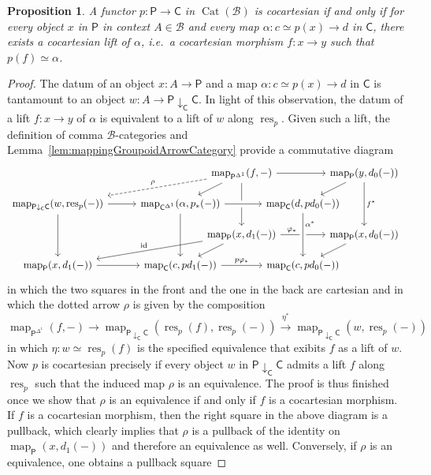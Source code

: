 \documentclass[reqno]{amsart}
\numberwithin{equation}{subsection}
\theoremstyle{plain}
\newtheorem{proposition}[equation]{Proposition}
\theoremstyle{definition}
\let\scr=\mathcal
\let\phi=\varphi
\def\BB{\scr B}
\DeclareMathOperator{\id}{id}
\DeclareMathOperator{\Cat}{Cat}
\DeclareMathOperator{\Map}{map}
\DeclareMathOperator{\res}{res}
\newcommand{\map}[1]{\Map_{#1}}
\newcommand{\I}[1]{\mathsf{#1}}
\newcommand{\Comma}[3]{{#1}\downarrow_{#2}{#3}}
\begin{document}
\begin{proposition}
	\label{prop:characterisationCocartesianFibrationCocartesianMaps}
	A functor $p\colon \I{P}\to\I{C}$ in $\Cat(\BB)$ is cocartesian if and only if for every object $x$ in $\I{P}$ in context $A\in\BB$ and every map $\alpha\colon c\simeq p(x)\to d$ in $\I{C}$, there exists a cocartesian lift of $\alpha$, i.e.\ a cocartesian morphism $f\colon x\to y$ such that $p(f)\simeq \alpha$.
\end{proposition}
\begin{proof}
	The datum of an object $x\colon A\to\I{P}$ and a map $\alpha\colon c\simeq p(x)\to d$ in $\I{C}$ is tantamount to an object $w\colon A\to \Comma{\I{P}}{\I{C}}{\I{C}}$. In light of this observation, the datum of a lift $f\colon x\to y$ of $\alpha$ is equivalent to a lift of $w$ along $\res_p$. Given such a lift, the definition of comma $\BB$-categories and Lemma~\ref{lem:mappingGroupoidArrowCategory} provide a commutative diagram
	\begin{equation*}
	\begin{tikzcd}[column sep={6em,between origins},row sep={3em,between origins}]
	& && \map{\I{P}^{\Delta^1}}(f, -)\arrow[rr]\arrow[dl]\arrow[dd]&& \map{\I{P}}(y, d_0(-))\arrow[dl]\arrow[dd, "f^\ast"] \\
	\map{\Comma{\I{P}}{\I{C}}{\I{C}}}(w,\res_p(-))\arrow[dd]\arrow[rr]\arrow[from=urrr, dashed, "\rho"'] && \map{\I{C}^{\Delta^1}}(\alpha, p_\ast(-))\arrow[dd, crossing over]\arrow[rr, crossing over] && \map{\I{C}}(d,pd_0(-)) &\\
	& && \map{\I{P}}(x,d_1(-))\arrow[rr, "\phi_\ast", near start]\arrow[dl]&& \map{\I{P}}(x,d_0(-))\arrow[dl]\\
	\map{\I{P}}(x,d_1(-))\arrow[rr]\arrow[from=urrr, "\id"'] && \map{\I{C}}(c, pd_1(-))\arrow[rr, "p\phi_\ast"] && \map{\I{C}}(c,pd_0(-))\arrow[from=uu, crossing over, "\alpha^\ast", near start] &
	\end{tikzcd}
	\end{equation*}
	in which the two squares in the front and the one in the back are cartesian and in which the dotted arrow $\rho$ is given by the composition
	\begin{equation*}
	\map{\I{P}^{\Delta^1}}(f,-)\to \map{\Comma{\I{P}}{\I{C}}{\I{C}}}(\res_p(f),\res_p(-))\xrightarrow{\eta^\ast} \map{\Comma{\I{P}}{\I{C}}{\I{C}}}(w,\res_p(-))
	\end{equation*}
	in which $\eta\colon w\simeq\res_p(f)$ is the specified equivalence that exibits $f$ as a lift of $w$. Now $p$ is cocartesian precisely if every object $w$ in $\Comma{\I{P}}{\I{C}}{\I{C}}$ admits a lift $f$ along $\res_p$ such that the induced map $\rho$ is an equivalence. The proof is thus finished once we show that $\rho$ is an equivalence if and only if $f$ is a cocartesian morphism. If $f$ is a cocartesian morphism, then the right square in the above diagram is a pullback, which clearly implies that $\rho$ is a pullback of the identity on $\map{\I{P}}(x,d_1(-))$ and therefore an equivalence as well. Conversely, if $\rho$ is an equivalence, one obtains a pullback square

\end{proof}
\end{document}
